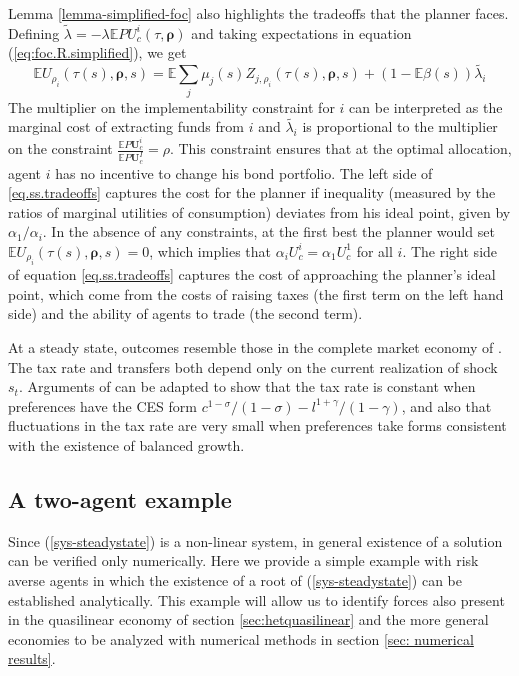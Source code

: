 \documentclass[thmsb,11pt]{article}
\begin{document}
\color{black}

Lemma \ref{lemma-simplified-foc} also highlights the tradeoffs that the planner faces.  Defining $\tilde{\lambda}=-\lambda \mathbb{E}P U^i_c(\tau,\bm \rho)$ and taking expectations in equation (\ref{eq:foc.R.simplified}), we get
\begin{equation}
\label{eq.ss.tradeoffs}
\mathbb{E} U_{\rho_i}(\tau(s),\bm \rho,s)= \mathbb{E} \sum_j\mu_j(s)Z_{j,\rho_i}(\tau(s),\bm \rho,s) + (1-\mathbb{E}\beta(s))\tilde{\lambda_i}
\end{equation}
The multiplier on the implementability constraint for $i$ can be interpreted as the marginal cost of extracting funds from $i$  and $\tilde{\lambda_i}$ is proportional to the multiplier on the constraint $\frac{\mathbb{E}P\bm{U}^i_c}{\mathbb{E}P \bm{U}^{I}_c}=\rho$. This constraint ensures that at the optimal allocation, agent $i$ has no  incentive to change his bond portfolio. The left side of \eqref{eq.ss.tradeoffs} captures the cost for the planner if inequality (measured by the ratios of marginal utilities of consumption) deviates from his ideal point, given by $\alpha_1/\alpha_i$. In the absence of any constraints, at the first best the planner would set $\mathbb{E} U_{\rho_i}(\tau(s),\bm \rho,s)=0$, which implies that $\alpha_i U^i_c = \alpha_1 U^1_c$ for all $i$. The right  side of equation \eqref{eq.ss.tradeoffs} captures the cost of approaching the planner's ideal point, which come from the costs of raising taxes (the first term on the left hand side) and the ability of
agents to trade (the second term).

At a steady state, outcomes resemble those in  the complete market economy of \citet{Wer07a}.
The tax rate  and transfers both depend only on the current realization of shock $s_t$.
Arguments of \citeauthor{Wer07a} can be adapted  to show that the tax rate is
constant when preferences have the CES form $c^{1-\sigma}/(1-\sigma) - l^{1+\gamma}/(1-\gamma) $,  and also that fluctuations in the tax rate
are very small when preferences take forms consistent with the existence of  balanced growth.


\subsection{A two-agent example}\label{sec: 2 agent example}


Since  (\ref{sys-steadystate}) is a non-linear system, in general existence of a solution can   be verified only numerically.
      Here we provide a simple example with risk averse agents in which the existence of a root of (\ref{sys-steadystate}) can be established analytically. This example will allow us to identify forces also present in the quasilinear economy
of section \ref{sec:hetquasilinear} and  the more general economies to be analyzed with numerical methods in section \ref{sec: numerical results}.
\end{document}
